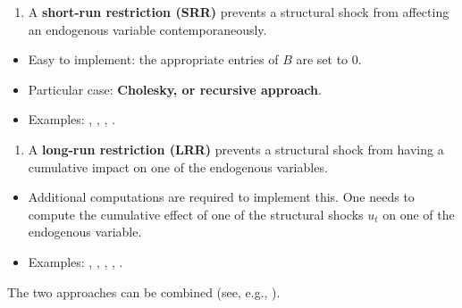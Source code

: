 \documentclass[
  12pt,
]{book}
\providecommand{\tightlist}{%
  \setlength{\itemsep}{0pt}\setlength{\parskip}{0pt}}
\theoremstyle{definition}
\theoremstyle{definition}
\theoremstyle{definition}
\theoremstyle{definition}
\theoremstyle{remark}
\begin{document}
\begin{enumerate}
\def\labelenumi{\arabic{enumi}.}
\tightlist
\item
  A \textbf{short-run restriction (SRR)} prevents a structural shock from affecting an endogenous variable contemporaneously.
\end{enumerate}

\begin{itemize}
\tightlist
\item
  Easy to implement: the appropriate entries of \(B\) are set to 0.
\item
  Particular case: \textbf{Cholesky, or recursive approach}.
\item
  Examples: \citet{BERNANKE198649}, \citet{Sims_1986}, \citet{Gali_1992}, \citet{RubioRamirez_et_al_2010}.
\end{itemize}

\begin{enumerate}
\def\labelenumi{\arabic{enumi}.}
\setcounter{enumi}{1}
\tightlist
\item
  A \textbf{long-run restriction (LRR)} prevents a structural shock from having a cumulative impact on one of the endogenous variables.
\end{enumerate}

\begin{itemize}
\tightlist
\item
  Additional computations are required to implement this. One needs to compute the cumulative effect of one of the structural shocks \(u_{t}\) on one of the endogenous variable.
\item
  Examples: \citet{Blanchard_Quah_1989}, \citet{Faust_Leeper_1997}, \citet{Gali_1999}, \citet{Erceg_et_al_2005}, \citet{NBERc11177}.
\end{itemize}

The two approaches can be combined (see, e.g., \citet{Gerlach_Smets_1995}).
\end{document}
